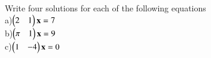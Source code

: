 Write four solutions for each of the following equations \\
a)$\begin{pmatrix}2 & 1\end{pmatrix}\mathbf{x} = 7$ \\
b)$\begin{pmatrix}\pi & 1\end{pmatrix}\mathbf{x} = 9$ \\
c)$\begin{pmatrix}1 & -4\end{pmatrix}\mathbf{x} = 0$